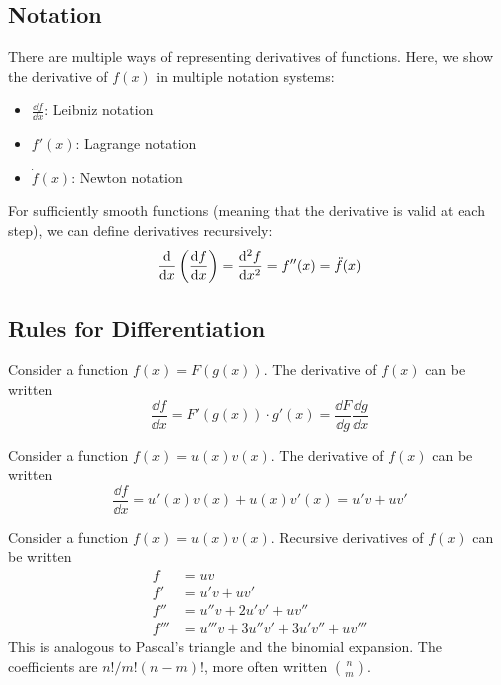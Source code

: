\documentclass{article}
\begin{document}
	\subsection{Notation}
	There are multiple ways of representing derivatives of functions. Here, we show the derivative of $f(x)$ in multiple notation systems:
	\begin{itemize}
		\item $\displaystyle \frac{\dd f}{\dd x}$: Leibniz notation
		\item $f'(x)$: Lagrange notation
		\item $\dot f (x)$: Newton notation
	\end{itemize}

	For sufficiently smooth functions (meaning that the derivative is valid at each step), we can define derivatives recursively:
	\[
		\frac{\mathrm{d}}{\dd x}\left( \frac{\dd f}{\dd x} \right)
		= \frac{\mathrm{d}^2f}{\dd x^2}
		= f''(x) = \ddot f (x)
	\]
	
	\subsection{Rules for Differentiation}
	\begin{definition}
		Consider a function $f(x) = F(g(x))$. The derivative of $f(x)$ can be written
		\begin{equation}
			\frac{\dd f}{\dd x} = F'(g(x)) \cdot g'(x) = \frac{\dd F}{\dd g} \frac{\dd g}{\dd x}
		\end{equation}
	\end{definition}

	\begin{definition}
		Consider a function $f(x) = u(x)v(x)$. The derivative of $f(x)$ can be written
		\begin{equation}
			\frac{\dd f}{\dd x} = u'(x)v(x) + u(x)v'(x) = u'v + uv'
		\end{equation}
	\end{definition}

	\begin{definition}
		Consider a function $f(x) = u(x)v(x)$. Recursive derivatives of $f(x)$ can be written
		\begin{align}
			f &= uv \\
			f' &= u'v + uv' \nonumber\\
			f'' &= u''v + 2u'v' + uv'' \nonumber\\
			f''' &= u'''v + 3u''v' + 3u'v'' + uv''' \nonumber
		\end{align}
		This is analogous to Pascal's triangle and the binomial expansion. The coefficients are $n!/m!(n-m)!$, more often written $n \choose m$.
	\end{definition}
\end{document}
